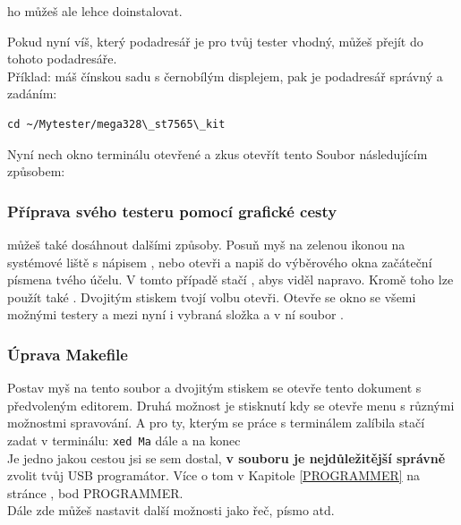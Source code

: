 ho můžeš ale lehce doinstalovat.

Pokud nyní víš, který podadresář je pro tvůj tester vhodný, můžeš přejít do tohoto podadresáře.\\
Příklad: máš čínskou sadu s černobílým displejem, pak je podadresář  správný
a zadáním:
\begin{large} \vspace{-0.4em} \begin{verbatim}
cd ~/Mytester/mega328\_st7565\_kit
\end{verbatim} \end{large}

Nyní nech okno terminálu otevřené a zkus otevřít tento Soubor následujícím způsobem:
\vspace*{-0.3em}   
\subsubsection{Příprava svého testeru pomocí grafické cesty}
 můžeš také dosáhnout dalšími způsoby.
Posuň myš na zelenou ikonou   na systémové liště s nápisem , nebo otevři  a napiš do výběrového okna začáteční písmena tvého účelu. V tomto případě stačí , abys viděl  napravo. Kromě toho lze použít  také . Dvojitým stiskem \LMB tvojí volbu otevři. Otevře se okno se všemi možnými testery a mezi nyní i vybraná složka  a v ní soubor .
\vspace*{-0.3em} 
\subsubsection{Úprava Makefile}
Postav myš na tento soubor a dvojitým stiskem \LMB se otevře tento dokument s předvoleným editorem. Druhá možnost je stisknutí \RMB kdy se otevře menu
s různými možnostmi spravování. A pro ty, kterým se práce s terminálem zalíbila stačí zadat v terminálu:
\verb"xed Ma" dále  a na konec \keys{\return}\\

Je jedno jakou cestou jsi se sem dostal, \textbf {v souboru  je nejdůležitější správně} zvolit tvůj USB programátor.
Více o tom v Kapitole \ref{PROGRAMMER} na stránce \pageref{PROGRAMMER}, bod PROGRAMMER.\\
Dále zde můžeš nastavit další možnosti jako řeč, písmo atd.
\vspace*{-0.3em} 
